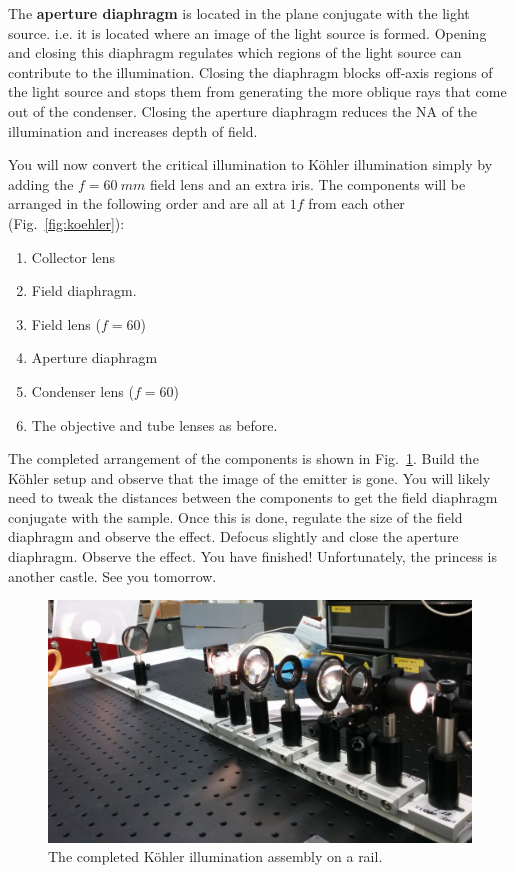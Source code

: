 \documentclass[a4paper]{report}
\begin{document}
The \textbf{aperture diaphragm} is located in the plane conjugate with the light source. 
i.e. it is located where an image of the light source is formed. 
Opening and closing this diaphragm regulates which regions of the light source can contribute to the illumination. 
Closing the diaphragm blocks off-axis regions of the light source and stops them from generating the more oblique rays that come out of the condenser. 
Closing the aperture diaphragm reduces the NA of the illumination and increases depth of field. 

\clearpage

You will now convert the critical illumination to K\"{o}hler illumination simply by adding the $f=60~mm$ field lens and an extra iris.
The components will be arranged in the following order and are all at $1f$ from each other (Fig.~\ref{fig:koehler}):
\begin{enumerate}
\setlength\itemsep{0.1em}
\item Collector lens
\item Field diaphragm.
\item Field lens ($f=60$)
\item Aperture diaphragm
\item Condenser lens ($f=60$)
\item The objective and tube lenses as before.
\end{enumerate}

The completed arrangement of the components is shown in Fig.~\ref{fig:koehler_completed}. 
Build the K\"{o}hler setup and observe that the image of the emitter is gone. 
You will likely need to tweak the distances between the components to get the field diaphragm conjugate with the sample. 
Once this is done, regulate the size of the field diaphragm and observe the effect. 
Defocus slightly and close the aperture diaphragm. Observe the effect.
You have finished! Unfortunately, the princess is another castle. See you tomorrow. 

\begin{figure}[h]
\center
\includegraphics[width=5.5in]{illum_complete.eps}
\caption{The completed K\"{o}hler illumination assembly on a rail.}
\label{fig:koehler_completed}
\end{figure}
\end{document}
